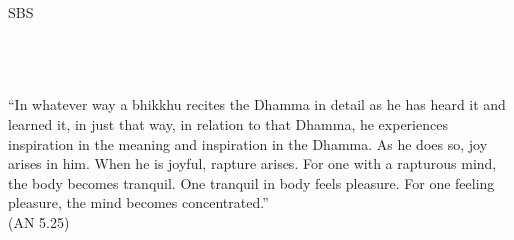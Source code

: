 \cleartorecto
\thispagestyle{empty}
\vspace*{3em}

{\centering

  \settowidth{\titleLength}{%
    {\Large\chapterTitleFont\textsc{\MakeUppercase{{\thetitle}}}}%
  }

  {\Huge\fontsize{64}{16}\sbsFont SBS}\\[1.0\baselineskip]%

  {\Huge\chapterTitleFont\textsc{{\thesubtitle\linebreak}}}\\[0.2\baselineskip]

  \\[1.4\baselineskip]

  {\Large\scshape \thetitle}\\[2.5\baselineskip]

  {\quote ``In whatever way a bhikkhu recites the Dhamma in detail as he has heard it and learned it, in just that way, in relation to that Dhamma, he experiences inspiration in the meaning and inspiration in the Dhamma. As he does so, joy arises in him. When he is joyful, rapture arises. For one with a rapturous mind, the body becomes tranquil. One tranquil in body feels pleasure. For one feeling pleasure, the mind becomes concentrated.''\\ \smallskip (AN 5.25)}\\[1.4\baselineskip]
}
